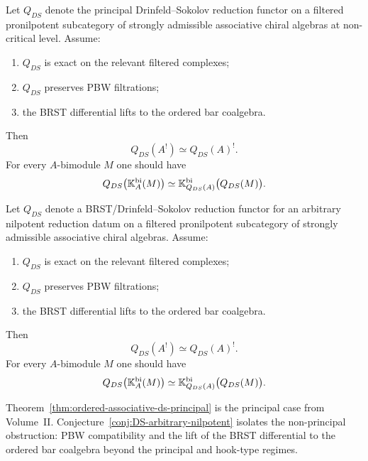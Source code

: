 \begin{theorem}
\label{thm:ordered-associative-ds-principal}
Let $Q_{DS}$ denote the principal Drinfeld--Sokolov reduction functor on a filtered pronilpotent
subcategory of strongly admissible associative chiral algebras at non-critical level. Assume:
\begin{enumerate}[label=(\alph*)]
\item $Q_{DS}$ is exact on the relevant filtered complexes;
\item $Q_{DS}$ preserves PBW filtrations;
\item the BRST differential lifts to the ordered bar coalgebra.
\end{enumerate}
Then
\[
Q_{DS}(A^!)\simeq Q_{DS}(A)^!.
\]
For every $A$-bimodule $M$ one should have
\[
Q_{DS}\bigl(\mathbb{K}_A^{\mathrm{bi}}(M)\bigr)\simeq
\mathbb{K}_{Q_{DS}(A)}^{\mathrm{bi}}\bigl(Q_{DS}(M)\bigr).
\]
\end{theorem}

\begin{conjecture}
\ClaimStatusConjectured
\label{conj:DS-arbitrary-nilpotent}
Let $Q_{DS}$ denote a BRST/Drinfeld--Sokolov reduction functor for an arbitrary nilpotent
reduction datum on a filtered pronilpotent subcategory of strongly admissible associative chiral
algebras. Assume:
\begin{enumerate}[label=(\alph*)]
\item $Q_{DS}$ is exact on the relevant filtered complexes;
\item $Q_{DS}$ preserves PBW filtrations;
\item the BRST differential lifts to the ordered bar coalgebra.
\end{enumerate}
Then
\[
Q_{DS}(A^!)\simeq Q_{DS}(A)^!.
\]
For every $A$-bimodule $M$ one should have
\[
Q_{DS}\bigl(\mathbb{K}_A^{\mathrm{bi}}(M)\bigr)\simeq
\mathbb{K}_{Q_{DS}(A)}^{\mathrm{bi}}\bigl(Q_{DS}(M)\bigr).
\]
\end{conjecture}

\begin{remark}
Theorem~\ref{thm:ordered-associative-ds-principal} is the principal
case from Volume~II. Conjecture~\ref{conj:DS-arbitrary-nilpotent}
isolates the non-principal obstruction: PBW compatibility and the
lift of the BRST differential to the ordered bar coalgebra beyond the
principal and hook-type regimes.
\end{remark}

